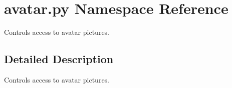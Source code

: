 \hypertarget{namespaceavatar_1_1py}{}\section{avatar.\+py Namespace Reference}
\label{namespaceavatar_1_1py}


Controls access to avatar pictures.  




\subsection{Detailed Description}
Controls access to avatar pictures. 
